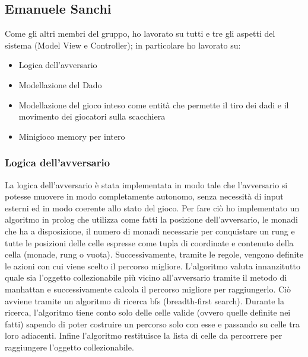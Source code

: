 \subsection{Emanuele Sanchi} \label{sec:implementation-sanchi}
Come gli altri membri del gruppo, ho lavorato su tutti e tre gli aspetti del sistema (Model View e Controller); in particolare ho
lavorato su:
\begin{itemize}
    \item Logica dell'avversario
    \item Modellazione del Dado
    \item Modellazione del gioco inteso come entità che permette il tiro dei dadi e il movimento dei giocatori sulla scacchiera
    \item Minigioco memory per intero
\end{itemize}
\subsubsection{Logica dell'avversario}
La logica dell'avversario è stata implementata in modo tale che l'avversario si potesse muovere in modo completamente autonomo,
senza necessità di input esterni ed in modo coerente allo stato del gioco. Per fare ciò ho implementato un algoritmo in prolog
che utilizza come fatti la posizione dell'avversario, le monadi che ha a disposizione, il numero di monadi necessarie per conquistare
un rung e tutte le posizioni delle celle espresse come tupla di coordinate e contenuto della cella (monade, rung o vuota).
Successivamente, tramite le regole, vengono definite le azioni con cui viene scelto il percorso migliore. L'algoritmo valuta
innanzitutto quale sia l'oggetto collezionabile più vicino all'avversario tramite il metodo di manhattan e successivamente calcola
il percorso migliore per raggiungerlo. Ciò avviene tramite un algoritmo di ricerca bfs (breadth-first search). Durante la ricerca,
l'algoritmo tiene conto solo delle celle valide (ovvero quelle definite nei fatti) sapendo di poter costruire un percorso solo con
esse e passando su celle tra loro adiacenti. Infine l'algoritmo restituisce la lista di celle da percorrere per raggiungere l'oggetto
collezionabile.

